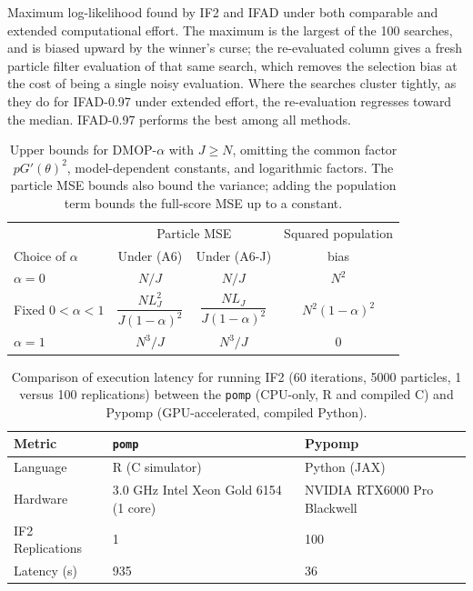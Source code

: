 \documentclass[numsec,webpdf,modern,medium,namedate]{oup-authoring-template}
\newcommand\arxiv[2]{#1}
\begin{document}
\clearpage
\begin{table}[htbp!]
\centering

\caption{Maximum log-likelihood found by IF2 and IFAD under both comparable and extended computational effort. The maximum is the largest of the 100 searches, and is biased upward by the winner's curse; the re-evaluated column gives a fresh particle filter evaluation of that same search, which removes the selection bias at the cost of being a single noisy evaluation. Where the searches cluster tightly, as they do for IFAD-0.97 under extended effort, the re-evaluation regresses toward the median. IFAD-0.97 performs the best among all methods.}
\arxiv{}{\vspace*{-7mm}}
\label{table:mle}
\end{table}
\clearpage
\begin{table}[htbp!]
\centering
\begin{tabular}{@{}lccc@{}}
\toprule
& \multicolumn{2}{c}{Particle MSE} & Squared population \\
\cmidrule(lr){2-3}
Choice of $\alpha$ & Under (A6) & Under (A6-J) & bias \\
\midrule
$\alpha=0$ & $N/J$ & $N/J$ & $N^2$ \\
Fixed $0<\alpha<1$ & $\dfrac{NL_J^2}{J(1-\alpha)^2}$
& $\dfrac{NL_J}{J(1-\alpha)^2}$ & $N^2(1-\alpha)^2$ \\[8pt]
$\alpha=1$ & $N^3/J$ & $N^3/J$ & $0$ \\
\bottomrule
\end{tabular}
\caption{Upper bounds for DMOP-$\alpha$ with $J\geq N$, omitting the common factor $pG'(\theta)^2$, model-dependent constants, and logarithmic factors.
The particle MSE bounds also bound the variance; adding the population term bounds the full-score MSE up to a constant.}
\label{tab:dmop-error-bounds}
\end{table}
\clearpage
\begin{table}[htbp!]
\centering
\begin{tabularx}{\linewidth}{lXX}
\toprule
Metric & \texttt{pomp} \citep{king16} & Pypomp \citep{abkemeier25} \\
\midrule
Language & R (C simulator) & Python (JAX) \\
Hardware& 3.0 GHz Intel Xeon Gold 6154 (1 core) & NVIDIA RTX6000 Pro Blackwell \\
IF2 Replications & 1 & 100 \\
Latency (s) & 935 & 36 \\
\bottomrule
\end{tabularx}
\caption{Comparison of execution latency for running IF2 (60 iterations, 5000 particles, 1 versus 100 replications) between the \texttt{pomp} (CPU-only, R and compiled C) and Pypomp (GPU-accelerated, compiled Python).}
\label{table:speedup}
\end{table}
\end{document}

